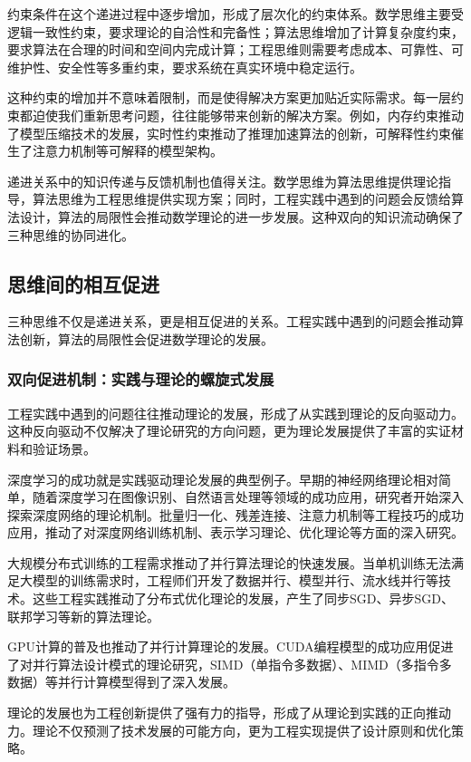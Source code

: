 约束条件在这个递进过程中逐步增加，形成了层次化的约束体系。数学思维主要受逻辑一致性约束，要求理论的自洽性和完备性；算法思维增加了计算复杂度约束，要求算法在合理的时间和空间内完成计算；工程思维则需要考虑成本、可靠性、可维护性、安全性等多重约束，要求系统在真实环境中稳定运行。

这种约束的增加并不意味着限制，而是使得解决方案更加贴近实际需求。每一层约束都迫使我们重新思考问题，往往能够带来创新的解决方案。例如，内存约束推动了模型压缩技术的发展，实时性约束推动了推理加速算法的创新，可解释性约束催生了注意力机制等可解释的模型架构。

递进关系中的知识传递与反馈机制也值得关注。数学思维为算法思维提供理论指导，算法思维为工程思维提供实现方案；同时，工程实践中遇到的问题会反馈给算法设计，算法的局限性会推动数学理论的进一步发展。这种双向的知识流动确保了三种思维的协同进化。

\subsection{思维间的相互促进}

三种思维不仅是递进关系，更是相互促进的关系。工程实践中遇到的问题会推动算法创新，算法的局限性会促进数学理论的发展。

\subsubsection{双向促进机制：实践与理论的螺旋式发展}

工程实践中遇到的问题往往推动理论的发展，形成了从实践到理论的反向驱动力。这种反向驱动不仅解决了理论研究的方向问题，更为理论发展提供了丰富的实证材料和验证场景。

深度学习的成功就是实践驱动理论发展的典型例子。早期的神经网络理论相对简单，随着深度学习在图像识别、自然语言处理等领域的成功应用，研究者开始深入探索深度网络的理论机制。批量归一化、残差连接、注意力机制等工程技巧的成功应用，推动了对深度网络训练机制、表示学习理论、优化理论等方面的深入研究。

大规模分布式训练的工程需求推动了并行算法理论的快速发展。当单机训练无法满足大模型的训练需求时，工程师们开发了数据并行、模型并行、流水线并行等技术。这些工程实践推动了分布式优化理论的发展，产生了同步SGD、异步SGD、联邦学习等新的算法理论。

GPU计算的普及也推动了并行计算理论的发展。CUDA编程模型的成功应用促进了对并行算法设计模式的理论研究，SIMD（单指令多数据）、MIMD（多指令多数据）等并行计算模型得到了深入发展。

理论的发展也为工程创新提供了强有力的指导，形成了从理论到实践的正向推动力。理论不仅预测了技术发展的可能方向，更为工程实现提供了设计原则和优化策略。


